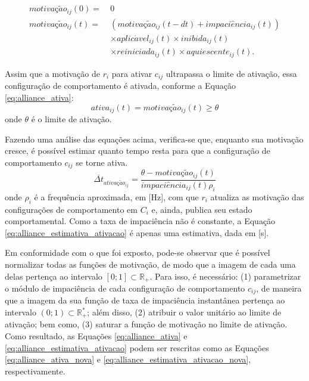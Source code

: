             \begin{equation} \label{eq:alliance_motivacao}
                \begin{aligned}
                    motiva\textit{ç}\tilde{a}o_{ij}(0) = \ & 0 \\
                    motiva\textit{ç}\tilde{a}o_{ij}(t) = \ & (motiva\textit{ç}\tilde{a}o_{ij}(t - dt) + impaci\hat{e}ncia_{ij}(t)) \\
                    & \times aplic\acute{a}vel_{ij}(t) \times inibida_{ij}(t) \\
                    & \times reiniciada_{ij}(t) \times aquiescente_{ij}(t).
                \end{aligned}
            \end{equation}
            
            Assim que a motivação de $r_i$ para ativar $c_{ij}$ ultrapassa o limite de ativação, essa configuração de comportamento é ativada, conforme a Equação \ref{eq:alliance_ativa}:
            \begin{equation} \label{eq:alliance_ativa}
                ativa_{ij}(t) = motiva\textit{ç}\tilde{a}o_{ij}(t) \geq \theta
            \end{equation}
            onde $\theta$ é o limite de ativação.
            
            Fazendo uma análise das equações acima, verifica-se que, enquanto sua motivação cresce, é possível estimar quanto tempo resta para que a configuração de comportamento $c_{ij}$ se torne ativa. 
            \begin{equation} \label{eq:alliance_estimativa_ativacao}
                \overline{\Delta t}_{ativa\textit{ç}\tilde{a}o_{ij}} = \frac{\theta - motiva\textit{ç}\tilde{a}o_{ij}(t)}{impaci\hat{e}ncia_{ij}(t) \rho_i}
            \end{equation}
            onde $\rho_i$ é a frequência aproximada, em [\si{\hertz}], com que $r_i$ atualiza as motivação das configurações de comportamento em $C_i$ e, ainda, publica seu estado comportamental. Como a taxa de impaciência não é constante, a Equação \ref{eq:alliance_estimativa_ativacao} é apenas uma estimativa, dada em [\si{\second}].
            
            Em conformidade com o que foi exposto, pode-se observar que é possível normalizar todas as funções de motivação, de modo que a imagem de cada uma delas pertença ao intervalo $[0; 1] \subset \mathbb{R}_+$. Para isso, é necessário: (1) parametrizar o módulo de impaciência de cada configuração de comportamento $c_{ij}$, de maneira que a imagem da sua função de taxa de impaciência instantânea pertença ao intervalo $(0; 1) \subset \mathbb{R}_+^*$; além disso, (2) atribuir o valor unitário ao limite de ativação; bem como, (3) saturar a função de motivação no limite de ativação. Como resultado, as Equações \ref{eq:alliance_ativa} e \ref{eq:alliance_estimativa_ativacao} podem ser rescritas como as Equações \ref{eq:alliance_ativa_nova} e \ref{eq:alliance_estimativa_ativacao_nova}, respectivamente.
            
